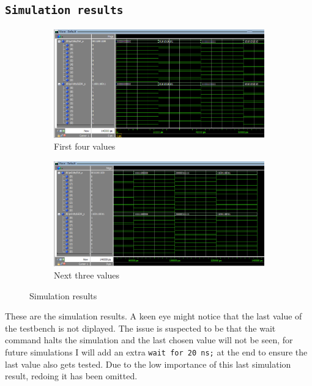\documentclass{article}
\let\oldsubsection\subsection
\renewcommand{\subsection}[1]{%
  \oldsubsection{\texttt{#1}}%
  \setcounter{subsubsection}{-1}%
}
\begin{document}
\subsection{Simulation results}
\begin{figure}[h]
    \centering
    \begin{subfigure}{1\textwidth}
        \centering
        \includegraphics[width=1\textwidth]{Figures/Part1_Sim1.png}
        \caption{First four values}
        \label{fig:T01sim1}
    \end{subfigure}
    \begin{subfigure}{1\textwidth}
        \centering
        \includegraphics[width=1\textwidth]{Figures/Part1_Sim2.png}
        \caption{Next three values}
        \label{fig:T01sim2}
    \end{subfigure}
    \caption{Simulation results}
    \label{fig:T01sim}
\end{figure}
These are the simulation results. A keen eye might notice that the last value of the testbench is not diplayed. The issue is suspected to be that the wait command halts the simulation and the last chosen value will not be seen, for future simulations I will add an extra \verb|wait for 20 ns;| at the end to ensure the last value also gets tested. Due to the low importance of this last simulation result, redoing it has been omitted.
\end{document}
